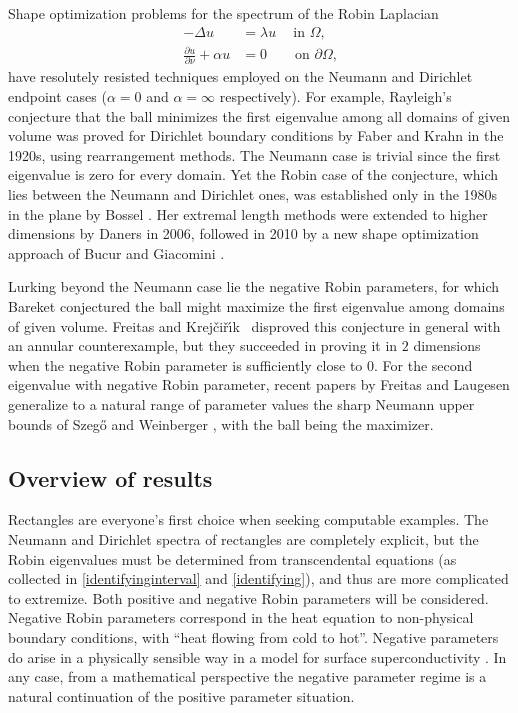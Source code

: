 \documentclass[12pt,reqno]{amsart}
\theoremstyle{definition}
\newcommand{\Krejcirik}{{Krej\v{c}i\v{r}\'{\i}k}}
\begin{document}
Shape optimization problems for the spectrum of the Robin Laplacian 
%
\begin{equation*}\label{robinproblem}
\begin{split}
- \Delta u & = \lambda u \ \quad \text{in $\Omega$,} \\
\frac{\partial u}{\partial\nu} + \alpha u & = 0 \qquad \text{on $\partial \Omega$,} 
\end{split}
\end{equation*}
%
have resolutely resisted techniques employed on the Neumann and Dirichlet endpoint cases ($\alpha=0$ and $\alpha=\infty$ respectively). For example, Rayleigh's conjecture that the ball minimizes the first eigenvalue among all domains of given volume was proved for Dirichlet boundary conditions by Faber and Krahn  in the 1920s, using rearrangement methods. The Neumann case  is trivial since the first eigenvalue is zero for every domain. Yet the Robin case of the conjecture, which lies between the Neumann and Dirichlet ones, was established only in the 1980s in the plane by Bossel \cite{B86}. Her extremal length methods were extended to higher dimensions by Daners \cite{D06} in 2006, followed in 2010 by a new shape optimization approach of Bucur and Giacomini \cite{BG10}. 

Lurking beyond the Neumann case lie the negative Robin parameters, for which Bareket \cite{B77} conjectured the ball might maximize the first eigenvalue among domains of given volume. Freitas and \Krejcirik\ \cite{FK15} disproved this conjecture in general with an annular counterexample, but they succeeded in proving it in $2$ dimensions when the negative Robin parameter is sufficiently close to $0$. For the second eigenvalue with negative Robin parameter, recent papers by Freitas and Laugesen \cite{FL18a,FL18b} generalize to a natural range of  parameter values the sharp Neumann upper bounds of Szeg\H{o} \cite{S54} and Weinberger \cite{W56}, with the ball being the maximizer.  

\subsection*{Overview of results} Rectangles are everyone's first choice when seeking computable examples. The Neumann and Dirichlet spectra of rectangles are completely explicit, but the Robin eigenvalues must be determined from transcendental equations (as collected in \autoref{identifyinginterval} and \autoref{identifying}), and thus are more complicated to extremize. Both positive and negative Robin parameters will be considered. Negative Robin parameters correspond in the heat equation to non-physical boundary conditions, with ``heat flowing from cold to hot''. Negative parameters do arise in a physically sensible way in a model for surface superconductivity \cite{GS07}. In any case, from a mathematical perspective the negative parameter regime is a natural continuation of the positive parameter situation. 
\end{document}

